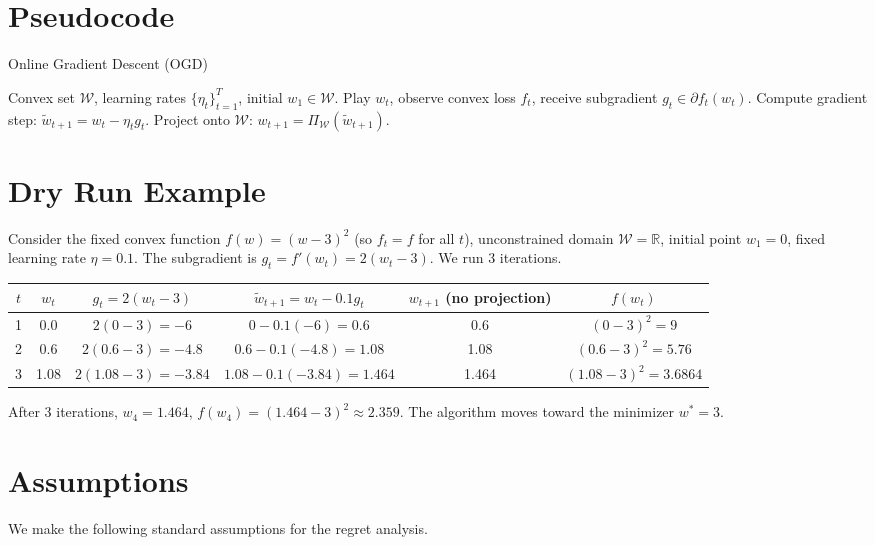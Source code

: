 \documentclass{article}
\newcommand{\R}{\mathbb{R}}
\begin{document}
\section*{Pseudocode}
\begin{algorithm}
\caption{Online Gradient Descent (OGD)}
\begin{algorithmic}[1]
\REQUIRE Convex set $\mathcal{W}$, learning rates $\{\eta_t\}_{t=1}^T$, initial $w_1 \in \mathcal{W}$.
    \STATE Play $w_t$, observe convex loss $f_t$, receive subgradient $g_t \in \partial f_t(w_t)$.
    \STATE Compute gradient step: $\tilde{w}_{t+1} = w_t - \eta_t g_t$.
    \STATE Project onto $\mathcal{W}$: $w_{t+1} = \Pi_{\mathcal{W}}(\tilde{w}_{t+1})$.
\ENDFOR
\end{algorithmic}
\end{algorithm}

\section*{Dry Run Example}
Consider the fixed convex function $f(w) = (w-3)^2$ (so $f_t = f$ for all $t$), unconstrained domain $\mathcal{W} = \R$, initial point $w_1 = 0$, fixed learning rate $\eta = 0.1$. The subgradient is $g_t = f'(w_t) = 2(w_t - 3)$. We run 3 iterations.

\begin{center}
\begin{tabular}{c c c c c c}
\toprule
$t$ & $w_t$ & $g_t = 2(w_t-3)$ & $\tilde{w}_{t+1} = w_t - 0.1 g_t$ & $w_{t+1}$ (no projection) & $f(w_t)$ \\
\midrule
1 & 0.0 & $2(0-3) = -6$ & $0 - 0.1(-6) = 0.6$ & 0.6 & $(0-3)^2 = 9$ \\
2 & 0.6 & $2(0.6-3) = -4.8$ & $0.6 - 0.1(-4.8) = 1.08$ & 1.08 & $(0.6-3)^2 = 5.76$ \\
3 & 1.08 & $2(1.08-3) = -3.84$ & $1.08 - 0.1(-3.84) = 1.464$ & 1.464 & $(1.08-3)^2 = 3.6864$ \\
\bottomrule
\end{tabular}
\end{center}
After 3 iterations, $w_4 = 1.464$, $f(w_4) = (1.464-3)^2 \approx 2.359$. The algorithm moves toward the minimizer $w^* = 3$.

\section*{Assumptions}
We make the following standard assumptions for the regret analysis.
\end{document}

